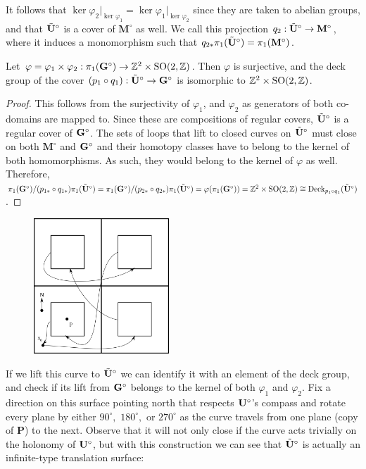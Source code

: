 \documentclass[a4paper, 11pt]{article}
\def\bMs{\mathbf{M}^\circ}
\def\btUs{\btU^\circ}
\def\SO{\mathrm{SO}}
\begin{document}
It follows that $\ker\varphi_2\vert_{\ker\varphi_1}=\ker\varphi_1\vert_{\ker\varphi_2}$ since they are taken to abelian groups, and that $\btUs$ is a cover of $\bMs$ as well. We call this projection $q_2:\btUs\rightarrow\bMs$, where it induces a monomorphism such that $q_{2*}\pi_1(\btUs)=\pi_1(\bMs)$.

\begin{thm}
Let $\varphi=\varphi_1\times\varphi_2:\pi_1(\bGs)\rightarrow\ZZ^2\times\SO(2,\ZZ)$. Then $\varphi$ is surjective, and the deck group of the cover $(p_1\circ q_1):\btUs\rightarrow\bGs$ is isomorphic to $\ZZ^2\times\SO(2,\ZZ)$.
\begin{proof}
This follows from the surjectivity of $\varphi_1$, and $\varphi_2$ as generators of both co-domains are mapped to. Since these are compositions of regular covers, $\btUs$ is a regular cover of $\mathbf{G}^\circ$. The sets of loops that lift to closed curves on $\btUs$ must close on both $\bMs$ and $\mathbf{G}^\circ$ and their homotopy classes have to belong to the kernel of both homomorphisms. As such, they would belong to the kernel of $\varphi$ as well. Therefore, $\pi_1(\bGs)/(p_{1*}\circ q_{1*})\pi_1(\btUs)=\pi_1(\bGs)/(p_{2*}\circ q_{2*})\pi_1(\btUs)=\varphi(\pi_1(\bGs))=\ZZ^2\times\SO(2,\ZZ)\cong \text{Deck}_{p_1\circ q_1}(\btUs)$.
\end{proof}
\end{thm}


\begin{figure}[H]
\centering
\includegraphics[width=2in]{overlay.png}
\end{figure}

\noindent If we lift this curve to $\btUs$ we can identify it with an element of the deck group, and check if its lift from $\mathbf{G}^\circ$ belongs to the kernel of both $\varphi_1$ and $\varphi_2$. Fix a direction on this surface pointing north that respects $\mathbf{U}^\circ$'s compass and rotate every plane by either $90^\circ,$ $180^\circ,$ or $270^\circ$ as the curve travels from one plane (copy of $\mathbf{P}$) to the next. Observe that it will not only close if the curve acts trivially on the holonomy of $\mathbf{U}^\circ$, but with this construction we can see that $\btUs$ is actually an infinite-type translation surface:
\end{document}
